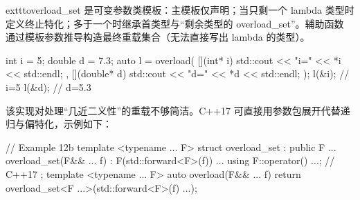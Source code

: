 	exttt{overload\_set} 是可变参数类模板：主模板仅声明；当只剩一个 lambda 类型时定义终止特化；多于一个时继承首类型与“剩余类型的 overload\_set”。辅助函数  通过模板参数推导构造最终重载集合（无法直接写出 lambda 的类型）。

\begin{code}
int i = 5;
double d = 7.3;
auto l = overload(
  [](int* i) { std::cout << "i=" << *i << std::endl; },
  [](double* d) { std::cout << "d=" << *d << std::endl; }
);
l(&i);    // i=5
l(&d);    // d=5.3
\end{code}

该实现对处理“几近二义性”的重载不够简洁。C++17 可直接用参数包展开代替递归与偏特化，示例如下：

\begin{code}
// Example 12b
template <typename ... F>
struct overload_set : public F ... {
  overload_set(F&& ... f) : F(std::forward<F>(f)) ... {}
  using F::operator() ...;    // C++17
};
template <typename ... F> auto overload(F&& ... f) {
  return overload_set<F ...>(std::forward<F>(f) ...);
}
\end{code}


